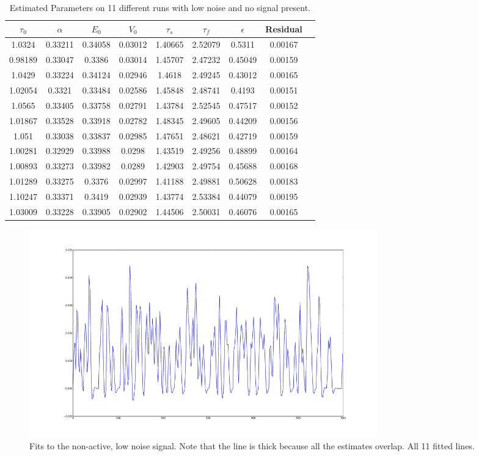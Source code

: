 \begin{table}[t]
\centering
\begin{tabular}{|c | c | c | c | c | c | c | c | c |}
\hline 
$\tau_0$ & $\alpha$ & $E_0$    & $V_0$    & $\tau_s$ & $\tau_f$ & $\epsilon$  &  Residual   \\
\hline 
1.0324 & 0.33211 & 0.34058 & 0.03012 & 1.40665 & 2.52079 & 0.5311 &   0.00167  \\
 0.98189 & 0.33047 & 0.3386 & 0.03014 & 1.45707 & 2.47232 & 0.45049 & 0.00159   \\
 1.0429 & 0.33224 & 0.34124 & 0.02946 & 1.4618 & 2.49245 & 0.43012 &  0.00165   \\
 1.02054 & 0.3321 & 0.33484 & 0.02586 & 1.45848 & 2.48741 & 0.4193 &  0.00151   \\
 1.0565 & 0.33405 & 0.33758 & 0.02791 & 1.43784 & 2.52545 & 0.47517 & 0.00152   \\
 1.01867 & 0.33528 & 0.33918 & 0.02782 & 1.48345 & 2.49605 & 0.44209 &0.00156   \\
 1.051 & 0.33038 & 0.33837 & 0.02985 & 1.47651 & 2.48621 & 0.42719 &  0.00159   \\
 1.00281 & 0.32929 & 0.33988 & 0.0298 & 1.43519 & 2.49256 & 0.48899 & 0.00164   \\
 1.00893 & 0.33273 & 0.33982 & 0.0289 & 1.42903 & 2.49754 & 0.45688 & 0.00168   \\
 1.01289 & 0.33275 & 0.3376 & 0.02997 & 1.41188 & 2.49881 & 0.50628 & 0.00183   \\
 1.10247 & 0.33371 & 0.3419 & 0.02939 & 1.43774 & 2.53384 & 0.44079 & 0.00195   \\
\hline                                                                  
1.03009 & 0.33228 & 0.33905 & 0.02902 & 1.44506 & 2.50031 & 0.46076 & 0.00165 \\
\hline
\end{tabular}
\caption{Estimated Parameters on 11 different runs with low noise and no signal present.}
\label{tab:NoiseOnlyResults} 
\end{table}

\begin{figure}[H]
\centering
\includegraphics[clip=true,trim=6cm 3cm 6cm 3cm,height=9cm]{images/fits_noiseonly}
\caption{Fits to the non-active, low noise signal. Note that the line is thick because all
the estimates overlap. All 11 fitted lines.}
\label{fig:fits_noiseonly}
\end{figure}

